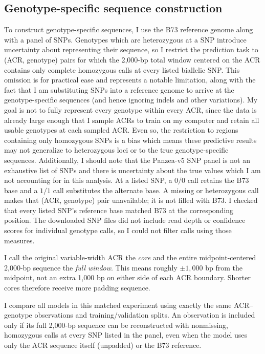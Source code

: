 \documentclass[10pt]{article}
\begin{document}
\subsection{Genotype-specific sequence construction}
To construct genotype-specific sequences, I use the B73 reference genome along with a panel of SNPs. Genotypes which are heterozygous at a SNP introduce uncertainty about representing their sequence, so I restrict the prediction task to (ACR, genotype) pairs for which the 2,000-bp total window centered on the ACR contains only complete homozygous calls at every listed biallelic SNP. This omission is for practical ease and represents a notable limitation, along with the fact that I am substituting SNPs into a reference genome to arrive at the genotype-specific sequences (and hence ignoring indels and other variations). My goal is not to fully represent every genotype within every ACR, since the data is already large enough that I sample ACRs to train on my computer and retain all usable genotypes at each sampled ACR. Even so, the restriction to regions containing only homozygous SNPs is a bias which means these predictive results may not generalize to heterozygous loci or to the true genotype-specific sequences. Additionally, I should note that the Panzea-v5 SNP panel is not an exhaustive list of SNPs and there is uncertainty about the true values which I am not accounting for in this analysis. At a listed SNP, a $0/0$ call retains the B73 base and a $1/1$ call substitutes the alternate base. A missing or heterozygous call makes that (ACR, genotype) pair unavailable; it is not filled with B73. I checked that every listed SNP’s reference base matched B73 at the corresponding position. The downloaded SNP files did not include read depth or confidence scores for individual genotype calls, so I could not filter calls using those measures.

I call the original variable-width ACR the \emph{core} and the entire midpoint-centered 2,000-bp sequence the \emph{full window}. This means roughly $\pm 1,000$ bp from the midpoint, not an extra 1,000 bp on either side of each ACR boundary. Shorter cores therefore receive more padding sequence. 

I compare all models in this matched experiment using exactly the same ACR–genotype observations and training/validation splits. An observation is included only if its full 2,000-bp sequence can be reconstructed with nonmissing, homozygous calls at every SNP listed in the panel, even when the model uses only the ACR sequence itself (unpadded) or the B73 reference. 
\end{document}
